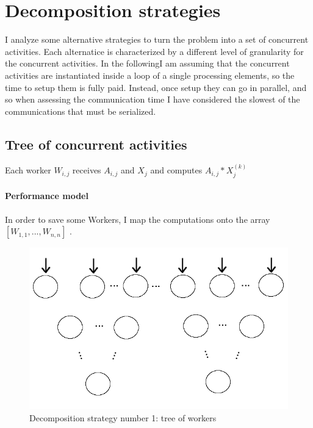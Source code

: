 \documentclass{article}
\begin{document}
\section{Decomposition strategies}
I analyze some alternative strategies to turn the problem into a set of concurrent activities. Each alternatice is characterized by a different level of granularity for the concurrent activities. In the followingI am assuming that the concurrent activities are instantiated inside a loop of a single processing elements, so the time to setup them is fully paid. Instead, once setup they can go in parallel, and so when assessing the communication time I have considered the slowest of the communications that must be serialized.

\subsection{Tree of concurrent activities}
Each worker $W_{i,j}$ receives $A_{i,j}$ and $X_{j}$ and computes $A_{i,j} * X_{j}^{(k)}$ 
\paragraph{Performance model} In order to save some Workers, I map the computations onto the array $[W_{1,1}, ... ,W_{n,n}]$ . \\

\begin{figure}[h]
\centering
\includegraphics[scale=0.43]{tree_ca}
\caption{Decomposition strategy number 1: tree of workers}
\label{fig:tree_ca}
\end{figure} 
\end{document}
